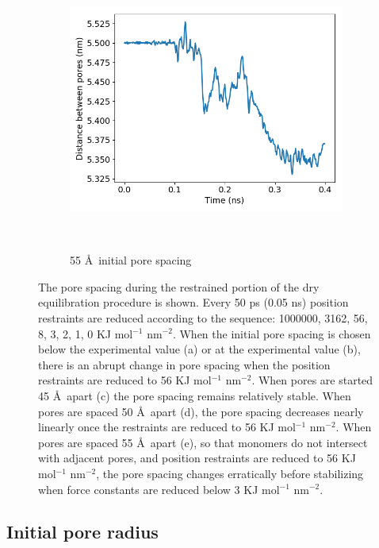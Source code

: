 \documentclass[journal=jpcbfk,manusciprt=article]{achemso}
\begin{document}
\begin{figure}[!htb]
\begin{subfigure}{0.3\textwidth}
			\includegraphics[width=\textwidth]{p2p_55.png}
			\vspace{-1.25em}
			\caption{55 \AA~initial pore spacing}~\label{fig:p2p_55}
		\end{subfigure}

		\caption{The pore spacing during the restrained portion of the
			dry equilibration procedure is shown. Every 50 ps (0.05 ns) position restraints
			are reduced according to the sequence: 1000000, 3162, 56, 8, 3, 2, 1, 0 KJ
			mol$^{-1}$ nm$^{-2}$. When the initial pore spacing is chosen below the
			experimental value (a) or at the experimental value (b), there is an abrupt
			change in pore spacing when the position restraints are reduced to 56 KJ
			mol$^{-1}$ nm$^{-2}$. When pores are started 45 \AA~apart (c) the pore spacing
			remains relatively stable. When pores are spaced 50 \AA~apart (d), the pore
			spacing decreases nearly linearly once the restraints are reduced to 56 KJ
			mol$^{-1}$ nm$^{-2}$. When pores are spaced 55 \AA~apart (e), so that monomers
			do not intersect with adjacent pores, and position restraints are reduced to 56
			KJ mol$^{-1}$ nm$^{-2}$, the pore spacing changes erratically before stabilizing
			when force constants are reduced below 3 KJ mol$^{-1}$ nm$^{-2}$.} 
		\label{fig:p2p}
	  \end{figure}

	  \subsection{Initial pore radius}\label{section:initial_pore_radius}
\end{document}
